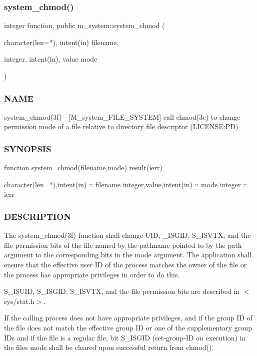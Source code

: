 \subsubsection{\texorpdfstring{system\+\_\+chmod()}{system\_chmod()}}
{\footnotesize\ttfamily integer function, public m\+\_\+system\+::system\+\_\+chmod (\begin{DoxyParamCaption}\item[{character(len=$\ast$), intent(in)}]{filename,  }\item[{integer, intent(in), value}]{mode }\end{DoxyParamCaption})}



\subsubsection*{N\+A\+ME}

system\+\_\+chmod(3f) -\/ \mbox{[}M\+\_\+system\+\_\+\+F\+I\+L\+E\+\_\+\+S\+Y\+S\+T\+EM\mbox{]} call chmod(3c) to change permission mode of a file relative to directory file descriptor (L\+I\+C\+E\+N\+SE\+:PD) \subsubsection*{S\+Y\+N\+O\+P\+S\+IS}

function system\+\_\+chmod(filename,mode) result(ierr)

character(len=$\ast$),intent(in) \+:\+: filename integer,value,intent(in) \+:\+: mode integer \+:\+: ierr

\subsubsection*{D\+E\+S\+C\+R\+I\+P\+T\+I\+ON}

The system\+\_\+chmod(3f) function shall change U\+ID, \+\_\+\+I\+S\+G\+ID, S\+\_\+\+I\+S\+V\+TX, and the file permission bits of the file named by the pathname pointed to by the path argument to the corresponding bits in the mode argument. The application shall ensure that the effective user ID of the process matches the owner of the file or the process has appropriate privileges in order to do this.

S\+\_\+\+I\+S\+U\+ID, S\+\_\+\+I\+S\+G\+ID, S\+\_\+\+I\+S\+V\+TX, and the file permission bits are described in $<$sys/stat.\+h$>$.

If the calling process does not have appropriate privileges, and if the group ID of the file does not match the effective group ID or one of the supplementary group I\+Ds and if the file is a regular file, bit S\+\_\+\+I\+S\+G\+ID (set-\/group-\/\+ID on execution) in the file\textquotesingle{}s mode shall be cleared upon successful return from chmod().

